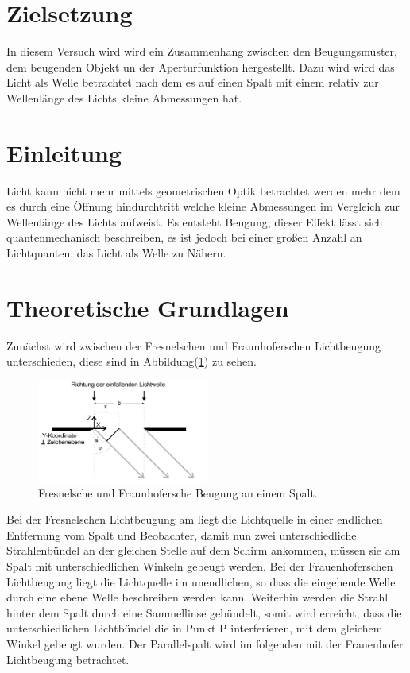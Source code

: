 \section{Zielsetzung}

    \noindent In diesem Versuch wird wird ein Zusammenhang zwischen den Beugungsmuster, dem beugenden Objekt un der Aperturfunktion hergestellt.
    Dazu wird wird das Licht als Welle betrachtet nach dem es auf einen Spalt mit einem relativ zur Wellenlänge des Lichts kleine Abmessungen hat.

\section{Einleitung}

    \noindent Licht kann nicht mehr mittels geometrischen Optik betrachtet werden mehr dem es durch eine Öffnung hindurchtritt welche kleine 
    Abmessungen im Vergleich zur Wellenlänge des Lichts aufweist. Es entsteht Beugung, dieser Effekt lässt sich quantenmechanisch beschreiben, 
    es ist jedoch bei einer großen Anzahl an Lichtquanten, das Licht als Welle zu Nähern. 

\section{Theoretische Grundlagen}

    \noindent Zunächst wird zwischen der Fresnelschen und Fraunhoferschen Lichtbeugung unterschieden, diese sind in Abbildung(\ref{img:einzel}) 
    zu sehen. 

    \begin{figure}[ht]
        \centering
        \includegraphics[width=0.5\textwidth]{latex/images/einzel.PNG}
        \caption{Fresnelsche und Fraunhofersche Beugung an einem Spalt\protect \cite{V406}.}
        \label{img:einzel}
    \end{figure}

    \noindent Bei der Fresnelschen Lichtbeugung am liegt die Lichtquelle in einer endlichen Entfernung vom Spalt und Beobachter, 
    damit nun zwei unterschiedliche Strahlenbündel an der gleichen Stelle auf dem Schirm ankommen, müssen sie am Spalt mit unterschiedlichen 
    Winkeln gebeugt werden. Bei der Frauenhoferschen Lichtbeugung liegt die Lichtquelle im unendlichen, so dass die eingehende Welle durch 
    eine ebene Welle beschreiben werden kann. Weiterhin werden die Strahl hinter dem Spalt durch eine Sammellinse gebündelt, somit wird 
    erreicht, dass die unterschiedlichen Lichtbündel die in Punkt P interferieren, mit dem gleichem Winkel gebeugt wurden. Der Parallelspalt 
    wird im folgenden mit der Frauenhofer Lichtbeugung betrachtet.

